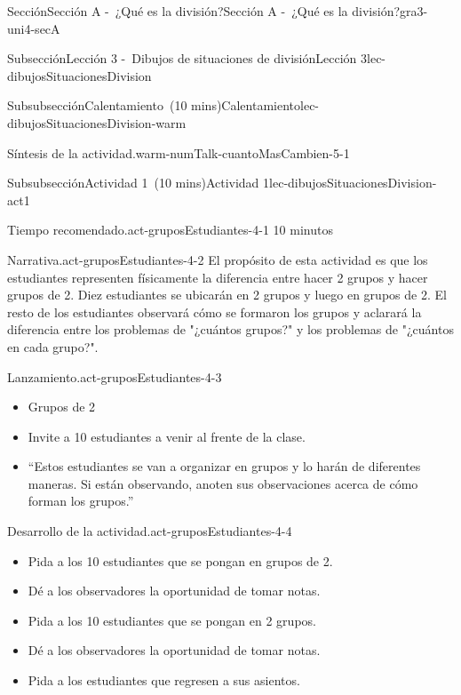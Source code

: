 \documentclass[oneside,10pt,]{article}
\begin{document}
\begin{sectionptx}{Sección}{Sección A -~¿Qué es la división?}{}{Sección A -~¿Qué es la división?}{}{}{gra3-uni4-secA}
\begin{subsectionptx}{Subsección}{Lección 3 -~Dibujos de situaciones de división}{}{Lección 3}{}{}{lec-dibujosSituacionesDivision}
\begin{subsubsectionptx}{Subsubsección}{Calentamiento~(10 mins)}{}{Calentamiento}{}{}{lec-dibujosSituacionesDivision-warm}
\begin{paragraphs}{Síntesis de la actividad.}{warm-numTalk-cuantoMasCambien-5-1}
\begin{itemize}[label=\textbullet]
%
\end{itemize}
\end{paragraphs}%
\end{subsubsectionptx}
%
%
\typeout{************************************************}
\typeout{************************************************}
%
\begin{subsubsectionptx}{Subsubsección}{Actividad 1~(10 mins)}{}{Actividad 1}{}{}{lec-dibujosSituacionesDivision-act1}
\par
\begin{paragraphs}{Tiempo recomendado.}{act-gruposEstudiantes-4-1}%
10 minutos%
\end{paragraphs}%
\begin{paragraphs}{Narrativa.}{act-gruposEstudiantes-4-2}%
El propósito de esta actividad es que los estudiantes representen físicamente la diferencia entre hacer 2 grupos y hacer grupos de 2. Diez estudiantes se ubicarán en 2 grupos y luego en grupos de 2. El resto de los estudiantes observará cómo se formaron los grupos y aclarará la diferencia entre los problemas de "¿cuántos grupos?" y los problemas de "¿cuántos en cada grupo?".%
\end{paragraphs}%
\begin{paragraphs}{Lanzamiento.}{act-gruposEstudiantes-4-3}%
%
\begin{itemize}[label=\textbullet]
\item{}Grupos de 2%
\item{}Invite a 10 estudiantes a venir al frente de la clase.%
\item{}``Estos estudiantes se van a organizar en grupos y lo harán de diferentes maneras. Si están observando, anoten sus observaciones acerca de cómo forman los grupos.''%
\end{itemize}
\end{paragraphs}%
\begin{paragraphs}{Desarrollo de la actividad.}{act-gruposEstudiantes-4-4}%
%
\begin{itemize}[label=\textbullet]
\item{}Pida a los 10 estudiantes que se pongan en grupos de 2.%
\item{}Dé a los observadores la oportunidad de tomar notas.%
\item{}Pida a los 10 estudiantes que se pongan en 2 grupos.%
\item{}Dé a los observadores la oportunidad de tomar notas.%
\item{}Pida a los estudiantes que regresen a sus asientos.%

\end{itemize}
\end{paragraphs}
\end{subsubsectionptx}
\end{subsectionptx}
\end{sectionptx}
\end{document}
